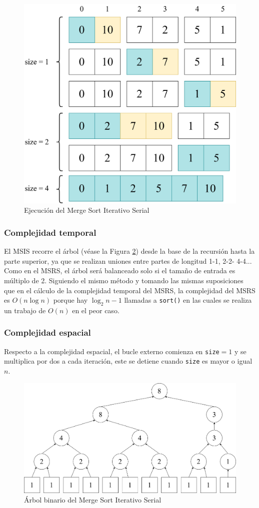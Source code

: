 \documentclass[titlepage]{article}
\begin{document}
\begin{figure}
    \centering
    \includegraphics[width=0.5\linewidth]{Diagrames/ejecucionMSIS.png}
    \caption{Ejecución del Merge Sort Iterativo Serial}
    \label{fig:ejecuciónMSIS}
\end{figure}

\subsubsection{Complejidad temporal}
El MSIS recorre el árbol (véase la Figura \ref{fig:arbolMSIS}) desde la base de la recursión hasta la parte superior, ya que se realizan uniones entre partes de longitud 1-1, 2-2- 4-4... Como en el MSRS, el árbol será balanceado solo si el tamaño de entrada es múltiplo de 2. Siguiendo el mismo método y tomando las mismas suposiciones que en el cálculo de la complejidad temporal del MSRS, la complejidad del MSRS es \(O(n \log{n})\) porque hay \(\log_2{n}-1\) llamadas a \lstinline|sort()| en las cuales se realiza un trabajo de \(O(n)\) en el peor caso.

\subsubsection{Complejidad espacial}
Respecto a la complejidad espacial, el bucle externo comienza en \lstinline|size|\(=1\) y se multiplica por dos a cada iteración, este se detiene cuando \lstinline|size| es mayor o igual \(n\).

\begin{figure}
    \centering
    \includegraphics[width=0.7\linewidth]{Diagrames/arbolMSISirregular.png}
    \caption{Árbol binario del Merge Sort Iterativo Serial}
    \label{fig:arbolMSIS}
\end{figure}
\end{document}
